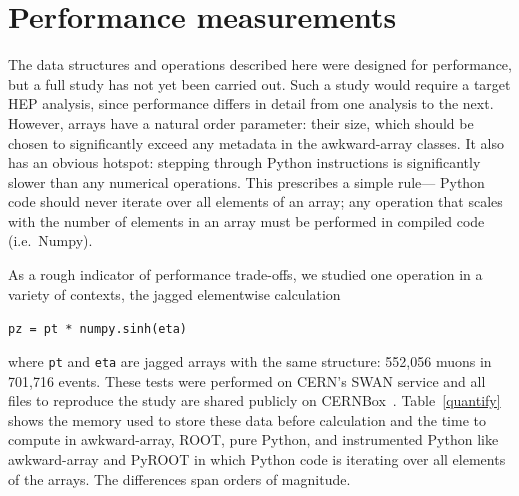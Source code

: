 \documentclass{webofc}
\begin{document}

\section{Performance measurements}

The data structures and operations described here were designed for performance, but a full study has not yet been carried out. Such a study would require a target HEP analysis, since performance differs in detail from one analysis to the next. However, arrays have a natural order parameter: their size, which should be chosen to significantly exceed any metadata in the awkward-array classes. It also has an obvious hotspot: stepping through Python instructions is significantly slower than any numerical operations. This prescribes a simple rule--- Python code should never iterate over all elements of an array; any operation that scales with the number of elements in an array must be performed in compiled code (i.e.\ Numpy).

As a rough indicator of performance trade-offs, we studied one operation in a variety of contexts, the jagged elementwise calculation
\begin{center}
\texttt{pz = pt * numpy.sinh(eta)}
\end{center}
\noindent where \texttt{pt} and \texttt{eta} are jagged arrays with the same structure: 552,056 muons in 701,716 events. These tests were performed on CERN's SWAN service and all files to reproduce the study are shared publicly on CERNBox~\cite{performance}. Table~\ref{quantify} shows the memory used to store these data before calculation and the time to compute in awkward-array, ROOT, pure Python, and instrumented Python like awkward-array and PyROOT in which Python code is iterating over all elements of the arrays. The differences span orders of magnitude.
\end{document}
